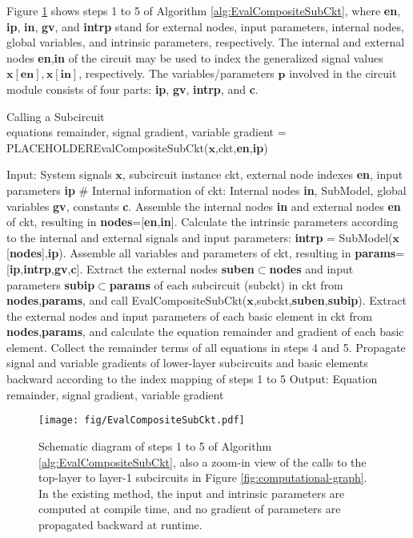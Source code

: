 Figure \ref{fig:EvalCompositeSubCkt} shows steps 1 to 5 of Algorithm \ref{alg:EvalCompositeSubCkt}, where \textbf{en}, \textbf{ip}, \textbf{in}, \textbf{gv}, and \textbf{intrp} stand for external nodes, input parameters, internal nodes, global variables, and intrinsic parameters, respectively. The internal and external nodes \textbf{en},\textbf{in} of the circuit may be used to index the generalized signal values $\bm{x}[\textbf{en}],\bm{x}[\textbf{in}]$, respectively. The variables/parameters $\bm{p}$ involved in the circuit module consists of four parts: \textbf{ip}, \textbf{gv}, \textbf{intrp}, and \textbf{c}.

\begin{algorithm}[h]
\caption{Calling a Subcircuit\\
    equations remainder, signal gradient, variable gradient = \\
    {\color{white}\tiny PLACEHOLDER}EvalCompositeSubCkt($\bm{x}$,ckt,\textbf{en},\textbf{ip})
    }
\label{alg:EvalCompositeSubCkt}
\SetAlgoLined
Input: System signals $\bm{x}$, subcircuit instance ckt,
  external node indexes \textbf{en}, input parameters \textbf{ip}\;
\# Internal information of ckt: Internal nodes \textbf{in}, SubModel, global variables \textbf{gv}, constants \textbf{c}. Assemble the internal nodes \textbf{in} and external nodes \textbf{en} of ckt, resulting in \textbf{nodes}=[\textbf{en},\textbf{in}]. Calculate the intrinsic parameters according to the internal and external signals and input parameters: \textbf{intrp} = SubModel($\bm{x}$[\textbf{nodes}],\textbf{ip}). Assemble all variables and parameters of ckt, resulting in \textbf{params}= [\textbf{ip},\textbf{intrp},\textbf{gv},\textbf{c}]. Extract the external nodes \textbf{suben}$\subset$\textbf{nodes} and input parameters \textbf{subip}$\subset$\textbf{params} of each subcircuit (subckt) in ckt from \textbf{nodes},\textbf{params}, and call EvalCompositeSubCkt($\bm{x}$,subckt,\textbf{suben},\textbf{subip}). Extract the external nodes and input parameters of each basic element in ckt from \textbf{nodes},\textbf{params}, and calculate the equation remainder and gradient of each basic element. Collect the remainder terms of all equations in steps 4 and 5. Propagate signal and variable gradients of lower-layer subcircuits and basic elements backward according to the index mapping of steps 1 to 5\;
Output: Equation remainder, signal gradient, variable gradient
\end{algorithm}
\begin{figure}[htpb]
\centering
\texttt{[image: fig/EvalCompositeSubCkt.pdf]}
\caption{Schematic diagram of steps 1 to 5 of Algorithm \ref{alg:EvalCompositeSubCkt}, also a zoom-in view of the calls to the top-layer to layer-1 subcircuits in Figure \ref{fig:computational-graph}. In the existing method, the input and intrinsic parameters are computed at compile time, and no gradient of parameters are propagated backward at runtime.}
\label{fig:EvalCompositeSubCkt}
\end{figure}

